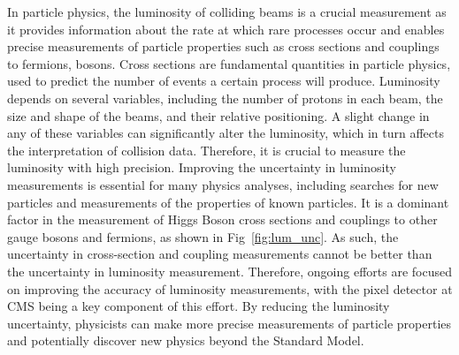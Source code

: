 In particle physics, the luminosity of colliding beams is a crucial measurement as it provides information about the rate at which rare processes occur and enables precise measurements of particle properties such as cross sections and couplings to fermions, bosons. Cross sections are fundamental quantities in particle physics, used to predict the number of events a certain process will produce. Luminosity depends on several variables, including the number of protons in each beam, the size and shape of the beams, and their relative positioning. A slight change in any of these variables can significantly alter the luminosity, which in turn affects the interpretation of collision data. Therefore, it is crucial to measure the luminosity with high precision.
Improving the uncertainty in luminosity measurements is essential for many physics analyses, including searches for new particles and measurements of the properties of known particles. It is a dominant factor in the measurement of Higgs Boson cross sections and couplings to other gauge bosons and fermions, as shown in Fig~\ref{fig:lum_unc}. As such, the uncertainty in cross-section and coupling measurements cannot be better than the uncertainty in luminosity measurement. Therefore, ongoing efforts are focused on improving the accuracy of luminosity measurements, with the pixel detector at CMS being a key component of this effort. By reducing the luminosity uncertainty, physicists can make more precise measurements of particle properties and potentially discover new physics beyond the Standard Model.


